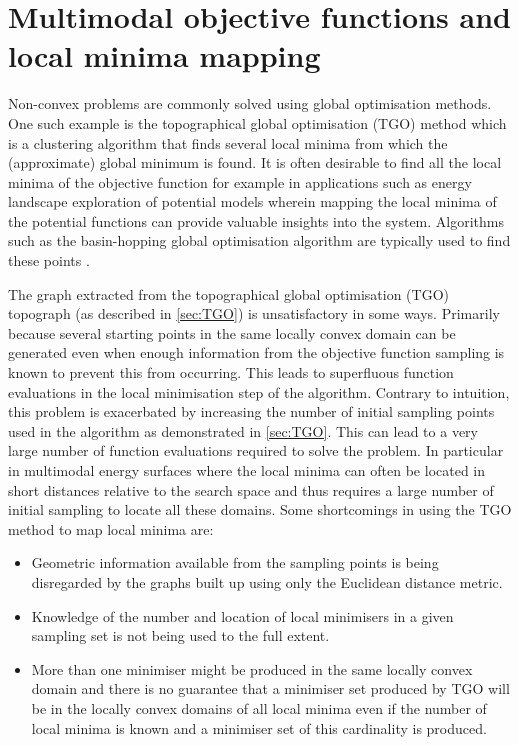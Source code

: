 \section{Multimodal objective functions and local minima mapping}
Non-convex problems are commonly solved using global optimisation methods. One such example is the topographical global optimisation (TGO) method \cite{Henderson2015, Torn1986, Torn1990, Torn1992} which is a clustering algorithm that finds several local minima from which the (approximate) global minimum is found. It is often desirable to find all the local minima of the objective function for example in applications such as energy landscape exploration of potential models wherein mapping the local minima of the potential functions can provide valuable insights into the system. Algorithms such as the basin-hopping global optimisation algorithm are typically used to find these points \citep{Wales2015}.





The graph extracted from the topographical global optimisation (TGO) \cite{Henderson2015, Torn1986, Torn1990, Torn1992} topograph (as described in \autoref{sec:TGO}) is unsatisfactory in some ways. Primarily because several starting points in the same locally convex domain can be generated even when enough information from the objective function sampling is known to prevent this from occurring. This leads to superfluous function evaluations in the local minimisation step of the algorithm. Contrary to intuition, this problem is exacerbated by increasing the number of initial sampling points used in the algorithm as demonstrated in \autoref{sec:TGO}. This can lead to a very large number of function evaluations required to solve the problem. In particular in multimodal energy surfaces where the local minima can often be located in short distances relative to the search space \cite{Zhang2011} and thus requires a large number of initial sampling to locate all these domains. Some shortcomings in using the TGO method to map local minima are:
\begin{itemize}
\item Geometric information available from the sampling points is being disregarded by the graphs built up using only the Euclidean distance metric.
\item Knowledge of the number and location of local minimisers in a given sampling set is not being used to the full extent.
\item More than one minimiser might be produced in the same locally convex domain and there is no guarantee that a minimiser set produced by TGO will be in the locally convex domains of all local minima even if the number of local minima is known and a minimiser set of this cardinality is produced.
\end{itemize}

